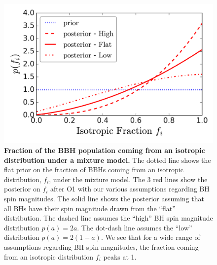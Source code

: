 \documentclass[modern,linenumbers]{aastex61}
\begin{document}
%
\begin{figure}
\centering
\includegraphics[width=\textwidth]{../plots/posterior_on_isotropic_fraction.png}
\caption{\textbf{Fraction of the BBH population coming from an
    isotropic distribution under a mixture model.} The dotted line
  shows the flat prior on the fraction of BBHs coming from an
  isotropic distribution, $f_i$, under the mixture model. The 3 red
  lines show the posterior on $f_i$ after O1 with our various
  assumptions regarding BH spin magnitudes.  The solid line shows the
  posterior assuming that all BHs have their spin magnitude drawn from
  the ``flat'' distribution. The dashed line assumes the ``high'' BH
  spin magnitude distribution $p(a) = 2a$. The dot-dash line assumes
  the ``low'' distribution $p(a) = 2(1-a)$.  We see that for a wide
  range of assumptions regarding BH spin magnitudes, the fraction
  coming from an isotropic distribution $f_i$ peaks at 1.}
\label{fig:mixture_fraction_posterior}
\end{figure}
%

%
\end{document}
